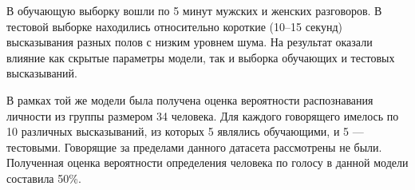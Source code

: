 \documentclass[12pt]{gost-7-32}
\begin{document}
В обучающую выборку вошли по 5 минут мужских и женских разговоров.
В тестовой выборке находились относительно короткие (10--15 секунд) высказывания разных полов с низким уровнем шума.
На результат оказали влияние как скрытые параметры модели, так и выборка обучающих и тестовых высказываний.

В рамках той же модели была получена оценка вероятности распознавания личности из группы размером 34 человека.
Для каждого говорящего имелось по 10 различных высказываний, из которых 5 являлись обучающими, и 5 --- тестовыми.
Говорящие за пределами данного датасета рассмотрены не были.
Полученная оценка вероятности определения человека по голосу в данной модели составила 50\%.

\newpage
{}






%


%

%


\end{document}
